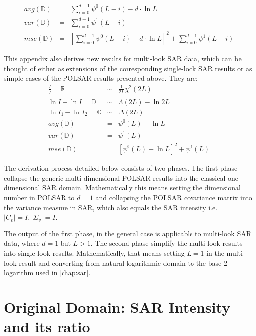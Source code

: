 \begin{eqnarray}
  avg(\mathbb{D}) &=& \sum^{d-1}_{i=0} \psi^0(L-i) - d \cdot \ln{L} \label{eqn:polsar_dispersion_averages} \\
  var(\mathbb{D}) &=& \sum^{d-1}_{i=0} \psi^1(L-i) \label{eqn:polsar_dispersion_variance} \\
  mse(\mathbb{D}) &=& \left[ \sum^{d-1}_{i=0} \psi^0(L-i) - d \cdot \ln{L} \right]^2 +  \sum^{d-1}_{i=0} \psi^1(L-i) \label{eqn:polsar_dispersion_mse}
\end{eqnarray}

This appendix also derives new results for multi-look SAR data,
  which can be thought of 
    either as extensions of the corresponding single-look SAR results
    or as simple cases of the POLSAR results presented above.
They are:
  \begin{eqnarray}
    \frac{I}{\bar{I}} = \mathbb{R} &\sim& \frac{1}{2L} \chi^2(2L) \\
    \ln{I} - \ln{\bar{I}} = \mathbb{D} &\sim& \Lambda(2L) - \ln{2L} \\
    \ln{I_1} - \ln{I_2} = \mathbb{C} &\sim& \Delta(2L) \\
    avg(\mathbb{D}) &=& \psi^0(L) - \ln{L} \\
    var(\mathbb{D}) &=& \psi^1(L) \\
    mse(\mathbb{D}) &=& \left[ \psi^0(L) - \ln{L} \right]^2 + \psi^1(L)
  \end{eqnarray}

The derivation process detailed below consists of two-phases.
The first phase collapse the generic multi-dimensional POLSAR results into the classical one-dimensional SAR domain.
Mathematically this means setting the dimensional number in POLSAR to  $d=1$
  and collapsing the POLSAR covariance matrix into the variance measure in SAR, which also equals the SAR intensity i.e. $|C_v|=I,|\Sigma_v|=\bar{I}$.

The output of the first phase, in the general case is applicable to multi-look SAR data, where $d=1$ but $L>1$.
The second phase simplify the multi-look results into single-look results.
Mathematically, that means setting $L=1$ in the multi-look result
  and converting from natural logarithmic domain to the base-2 logarithm used in \ref{chap:sar}.

\section{Original Domain: SAR Intensity and its ratio}

